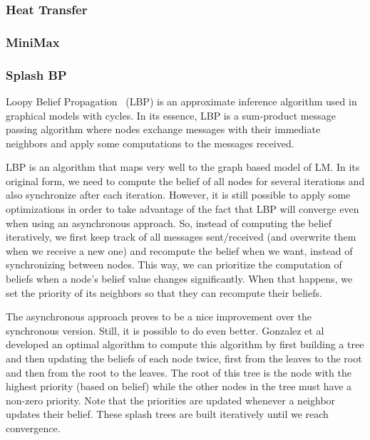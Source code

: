 \subsubsection{Heat Transfer}

\subsubsection{MiniMax}

\subsubsection{Splash BP}

Loopy Belief Propagation~\cite{Murphy99loopybelief} (LBP) is an approximate inference algorithm
used in graphical models with cycles. In its essence, LBP is a sum-product message passing algorithm
where nodes exchange messages with their immediate neighbors and apply some computations to the messages
received.

LBP is an algorithm that maps very well to the graph based model of LM. In its original form, we need to compute
the belief of all nodes for several iterations and also synchronize after each iteration.
However, it is still possible to apply
some optimizations in order to take advantage of the fact that LBP will converge even when using
an asynchronous approach. So, instead of computing the belief iteratively,
we first keep track of all messages sent/received (and overwrite them when we receive a new one)
and recompute the belief when we want, instead of synchronizing between nodes.
This way, we can prioritize the computation of beliefs when
a node's belief value changes significantly. When that happens, we set the priority of its
neighbors so that they can recompute their beliefs.

The asynchronous approach proves to be a nice improvement over the synchronous version. Still, it
is possible to do even better. Gonzalez et al~\cite{Gonzalez+al:aistats09paraml} developed an optimal
algorithm to compute this algorithm by first building a tree and then updating the beliefs of each node twice, first from the leaves to the root and then from the root to the leaves. The root of this tree
is the node with the highest priority (based on belief) while the other nodes in the tree
must have a non-zero priority. Note that the priorities are updated whenever a neighbor updates
their belief. These splash trees are built iteratively until we reach convergence.

